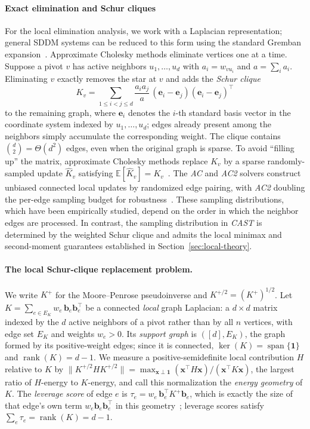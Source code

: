 \documentclass{article}
\newcommand{\CAST}{\textit{CAST}\xspace}
\newcommand{\AC}{\textit{AC}\xspace}
\newcommand{\ACtwo}{\textit{AC2}\xspace}
\newcommand{\1}{\mathbbm{1}}
\theoremstyle{plain}
\begin{document}
\paragraph{\textbf{Exact elimination and Schur cliques}}
For the local elimination analysis, we work with a Laplacian
representation; general SDDM systems can be reduced to this form
using the standard Gremban expansion~\cite{gremban1996combinatorial}. Approximate Cholesky methods eliminate vertices one at a time.
Suppose a pivot $v$ has active neighbors $u_1,\ldots,u_d$ with
$a_i=w_{vu_i}$ and $a=\sum_i a_i$. Eliminating $v$ exactly removes
the star at $v$ and adds the \emph{Schur clique}
\begin{equation}\label{eqn:pivot_clique}
 K_v = \sum_{1\le i<j\le d}\frac{a_i a_j}{a}\,
  (\mathbf{e}_i-\mathbf{e}_j)(\mathbf{e}_i-\mathbf{e}_j)^\top
\end{equation}
to the remaining graph, where $\mathbf{e}_i$ denotes the $i$-th standard basis vector in the coordinate system indexed by $u_1,\ldots,u_d$; edges already present among the neighbors simply accumulate the corresponding weight. The clique contains $\binom{d}{2}=\Theta(d^2)$ edges, even when the original graph is sparse. To avoid ``filling up'' the matrix, approximate Cholesky methods replace $K_v$ by a sparse randomly-sampled update $\widehat K_v$ satisfying $\mathbb{E}[\widehat K_v] = K_v$~\cite{kyng2016approximate,AC}.  
The \AC and \ACtwo solvers construct unbiased connected local updates by randomized edge pairing, with \ACtwo doubling the per-edge sampling budget for robustness~\cite{AC}. These sampling distributions, which have been empirically studied, depend on the order in which the neighbor edges are processed. In contrast, the sampling distribution in \CAST is determined by the weighted Schur clique and admits the local minimax and second-moment guarantees established in Section~\ref{sec:local-theory}.


\paragraph{\textbf{The local Schur-clique replacement problem}.}
We write $K^+$ for the Moore--Penrose pseudoinverse and
$K^{+/2}=(K^+)^{1/2}$. Let
$K=\sum_{e\in E_K} w_e\,\mathbf b_e\mathbf b_e^\top$ be a connected
\emph{local} graph Laplacian: a $d\times d$ matrix indexed by the $d$
active neighbors of a pivot rather than by all $n$ vertices, with edge
set $E_K$ and weights $w_e>0$. Its \emph{support graph} is $([d],E_K)$,
the graph formed by its positive-weight edges; since it is connected,
$\ker(K)=\operatorname{span}\{\mathbf 1\}$ and
$\operatorname{rank}(K)=d-1$. We measure a positive-semidefinite local contribution $H$ relative to $K$
by $\lVert K^{+/2}HK^{+/2}\rVert=\max_{\mathbf x\perp\mathbf 1}
(\mathbf x^\top H\mathbf x)/(\mathbf x^\top K\mathbf x)$, the largest ratio of $H$-energy to $K$-energy, and call this normalization the \emph{energy geometry} of $K$. The \emph{leverage score} of edge $e$ is $\tau_e=w_e\,\mathbf b_e^\top K^+\mathbf b_e$, which is exactly the size of that edge's own term $w_e\mathbf b_e\mathbf b_e^\top$ in this geometry~\cite{spielman2008graph,kyng2016approximate}; leverage scores satisfy $\sum_e\tau_e=\operatorname{rank}(K)=d-1$.
\end{document}
